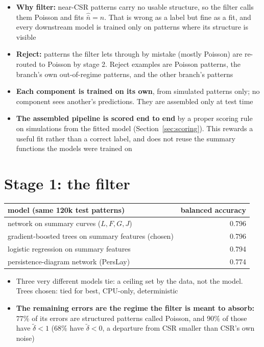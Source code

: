 \documentclass[11pt]{article}
\newcommand{\dt}{\tilde\delta}
\newcommand{\nb}{\bar n}
\begin{document}
\begin{itemize}
  \item \textbf{Why filter:} near-CSR patterns carry no usable structure, so the filter calls them Poisson and fits $\hat{\nb}=n$. That is wrong as a label but fine as a fit, and every downstream model is trained only on patterns where its structure is visible
  \item \textbf{Reject:} patterns the filter lets through by mistake (mostly Poisson) are re-routed to Poisson by stage 2. Reject examples are Poisson patterns, the branch's own out-of-regime patterns, and the other branch's patterns
  \item \textbf{Each component is trained on its own}, from simulated patterns only; no component sees another's predictions. They are assembled only at test time
  \item \textbf{The assembled pipeline is scored end to end} by a proper scoring rule on simulations from the fitted model (Section~\ref{sec:scoring}). This rewards a useful fit rather than a correct label, and does not reuse the summary functions the models were trained on
\end{itemize}

\section{Stage 1: the filter}

\begin{center}
\begin{tabular}{@{}lr@{}}
\toprule
model (same 120k test patterns) & balanced accuracy \\
\midrule
network on summary curves ($L,F,G,J$)               & 0.796 \\
gradient-boosted trees on summary features (chosen) & 0.796 \\
logistic regression on summary features             & 0.794 \\
persistence-diagram network (PersLay)               & 0.774 \\
\bottomrule
\end{tabular}
\end{center}

\begin{itemize}
  \item Three very different models tie: a ceiling set by the data, not the model. Trees chosen: tied for best, CPU-only, deterministic
  \item \textbf{The remaining errors are the regime the filter is meant to absorb:} $77\%$ of its errors are structured patterns called Poisson, and $90\%$ of those have $\dt<1$ ($68\%$ have $\dt<0$, a departure from CSR smaller than CSR's own noise)
\end{itemize}
\end{document}
